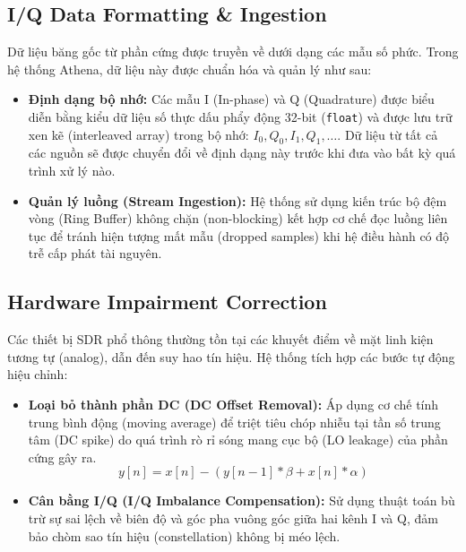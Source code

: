 \documentclass[11pt,a4paper]{article}
\begin{document}
\subsection{I/Q Data Formatting \& Ingestion}
Dữ liệu băng gốc từ phần cứng được truyền về dưới dạng các mẫu số phức. Trong hệ thống Athena, dữ liệu này được chuẩn hóa và quản lý như sau:
\begin{itemize}
    \item \textbf{Định dạng bộ nhớ:} Các mẫu I (In-phase) và Q (Quadrature) được biểu diễn bằng kiểu dữ liệu số thực dấu phẩy động 32-bit (\texttt{float}) và được lưu trữ xen kẽ (interleaved array) trong bộ nhớ: $I_0, Q_0, I_1, Q_1, \dots$. Dữ liệu từ tất cả các nguồn sẽ được chuyển đổi về định dạng này trước khi đưa vào bất kỳ quá trình xử lý nào. 
    \item \textbf{Quản lý luồng (Stream Ingestion):} Hệ thống sử dụng kiến trúc bộ đệm vòng (Ring Buffer) không chặn (non-blocking) kết hợp cơ chế đọc luồng liên tục để tránh hiện tượng mất mẫu (dropped samples) khi hệ điều hành có độ trễ cấp phát tài nguyên.
\end{itemize}

\subsection{Hardware Impairment Correction}
Các thiết bị SDR phổ thông thường tồn tại các khuyết điểm về mặt linh kiện tương tự (analog), dẫn đến suy hao tín hiệu. Hệ thống tích hợp các bước tự động hiệu chỉnh:
\begin{itemize}
    \item \textbf{Loại bỏ thành phần DC (DC Offset Removal):} Áp dụng cơ chế tính trung bình động (moving average) để triệt tiêu chóp nhiễu tại tần số trung tâm (DC spike) do quá trình rò rỉ sóng mang cục bộ (LO leakage) của phần cứng gây ra.
          \begin{equation}
              y[n] = x[n] - (y[n - 1] * \beta + x[n] * \alpha) 
          \end{equation}
    \item \textbf{Cân bằng I/Q (I/Q Imbalance Compensation):} Sử dụng thuật toán bù trừ sự sai lệch về biên độ và góc pha vuông góc giữa hai kênh I và Q, đảm bảo chòm sao tín hiệu (constellation) không bị méo lệch.
\end{itemize}
\end{document}
